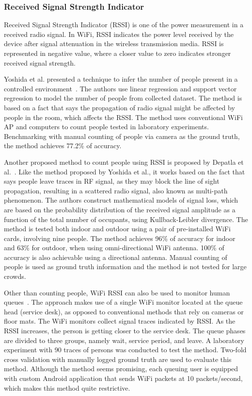 	\subsubsection{Received Signal Strength Indicator} %
	\label{ssub:rssi}
	Received Signal Strength Indicator (\ac{RSSI}) is one of the power measurement in a received radio signal. In WiFi, \ac{RSSI} indicates the power level received by the device after signal attenuation in the wireless transmission media. \ac{RSSI} is represented in negative value, where a closer value to zero indicates stronger received signal strength.

	Yoshida et al. presented a technique to infer the number of people present in a controlled environment~\cite{thesis052}. The authors use linear regression and support vector regression to model the number of people from collected dataset. The method is based on a fact that says the propagation of radio signal might be affected by people in the room, which affects the \ac{RSSI}. The method uses conventional WiFi \ac{AP} and computers to count people tested in laboratory experiments. Benchmarking with manual counting of people via camera as the ground truth, the method achieves 77.2\% of accuracy.

	Another proposed method to count people using \ac{RSSI} is proposed by Depatla et al.~\cite{thesis046}. Like the method proposed by Yoshida et al., it works based on the fact that says people leave traces in \ac{RF} signal, as they may block the line of sight propagation, resulting in a scattered radio signal, also known as multi-path phenomenon. The authors construct mathematical models of signal loss, which are based on the probability distribution of the received signal amplitude as a function of the total number of occupants, using Kullback-Leibler divergence. The method is tested both indoor and outdoor using a pair of pre-installed WiFi cards, involving nine people. The method achieves 96\% of accuracy for indoor and 63\% for outdoor, when using omni-directional WiFi antenna. 100\% of accuracy is also achievable using a directional antenna. Manual counting of people is used as ground truth information and the method is not tested for large crowds.

	Other than counting people, WiFi \ac{RSSI} can also be used to monitor human queues~\cite{thesis012}. The approach makes use of a single WiFi monitor located at the queue head (service desk), as opposed to conventional methods that rely on cameras or floor mats. The WiFi monitors collect signal traces indicated by \ac{RSSI}. As the \ac{RSSI} increases, the person is getting closer to the service desk. The queue phases are divided to three groups, namely wait, service period, and leave. A laboratory experiment with 90 traces of persons was conducted to test the method. Two-fold cross validation with manually logged ground truth are used to evaluate this method. Although the method seems promising, each queuing user is equipped with custom Android application that sends WiFi packets at 10 packets/second, which makes this method quite restrictive.

